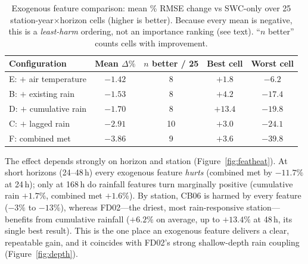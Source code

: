 \documentclass[11pt]{article}
\begin{document}
\begin{table}[h]
\centering
\caption{Exogenous feature comparison: mean \% RMSE change vs SWC-only over
25 station-year$\times$horizon cells (higher is better). Because every mean is
negative, this is a \emph{least-harm} ordering, not an importance ranking (see
text). ``$n$ better'' counts cells with improvement.}
\label{tab:rank}
\begin{tabular}{lcccc}
\toprule
\textbf{Configuration} & \textbf{Mean $\Delta\%$} & \textbf{$n$ better / 25}
& \textbf{Best cell} & \textbf{Worst cell} \\
\midrule
E: $+$ air temperature   & $-1.42$ & 8  & $+1.8$  & $-6.2$  \\
B: $+$ existing rain     & $-1.53$ & 8  & $+4.2$  & $-17.4$ \\
D: $+$ cumulative rain   & $-1.70$ & 8  & $+13.4$ & $-19.8$ \\
C: $+$ lagged rain       & $-2.91$ & 10 & $+3.0$  & $-24.1$ \\
F: combined met          & $-3.86$ & 9  & $+3.6$  & $-39.8$ \\
\bottomrule
\end{tabular}
\end{table}

The effect depends strongly on horizon and station
(Figure~\ref{fig:featheat}). At short horizons (24--48\,h) every exogenous
feature \emph{hurts} (combined met by $-11.7\%$ at 24\,h); only at 168\,h do
rainfall features turn marginally positive (cumulative rain $+1.7\%$, combined
met $+1.6\%$). By station, CB06 is harmed by every feature ($-3\%$ to $-13\%$),
whereas FD02---the driest, most rain-responsive station---benefits from
cumulative rainfall ($+6.2\%$ on average, up to $+13.4\%$ at 48\,h, its single
best result). This is the one place an exogenous feature delivers a clear,
repeatable gain, and it coincides with FD02's strong shallow-depth rain coupling
(Figure~\ref{fig:depth}).
\end{document}
